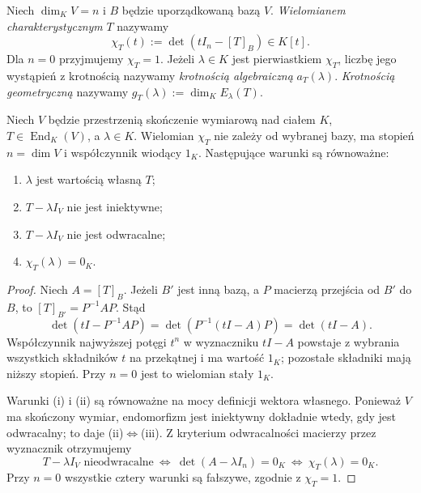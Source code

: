 \begin{definicja}
\label{def:lin14-charpoly}
Niech \(\dim_K V=n\) i \(B\) będzie
uporządkowaną bazą \(V\).
\emph{Wielomianem charakterystycznym}
\(T\) nazywamy
\[
 \chi_T(t):=\det(tI_n-[T]_B)\in K[t].
\]
Dla \(n=0\) przyjmujemy \(\chi_T=1\).
Jeżeli \(\lambda\in K\) jest pierwiastkiem
\(\chi_T\), liczbę jego wystąpień
z krotnością nazywamy
\emph{krotnością algebraiczną}
\(a_T(\lambda)\).
\emph{Krotnością geometryczną}
nazywamy
\(g_T(\lambda):=\dim_K E_\lambda(T)\).
\end{definicja}

\begin{stwierdzenie}
\label{prop:lin14-charpoly}
Niech \(V\) będzie przestrzenią skończenie
wymiarową nad ciałem \(K\),
\(T\in\operatorname{End}_K(V)\),
a \(\lambda\in K\).
Wielomian \(\chi_T\) nie zależy
od wybranej bazy, ma stopień
\(n=\dim V\) i współczynnik wiodący \(1_K\).
Następujące warunki są równoważne:
\begin{enumerate}[label=(\roman*)]
\item \(\lambda\) jest wartością własną \(T\);
\item \(T-\lambda I_V\) nie jest iniektywne;
\item \(T-\lambda I_V\) nie jest odwracalne;
\item \(\chi_T(\lambda)=0_K\).
\end{enumerate}
\end{stwierdzenie}
\begin{proof}
Niech \(A=[T]_B\).
Jeżeli \(B'\) jest inną bazą, a
\(P\) macierzą przejścia od \(B'\) do \(B\),
to
\([T]_{B'}=P^{-1}AP\).
Stąd
\[
 \det(tI-P^{-1}AP)
 =\det(P^{-1}(tI-A)P)=\det(tI-A).
\]
Współczynnik najwyższej potęgi \(t^n\)
w wyznaczniku \(tI-A\) powstaje
z wybrania wszystkich składników \(t\)
na przekątnej i ma wartość \(1_K\);
pozostałe składniki mają niższy stopień.
Przy \(n=0\) jest to wielomian stały \(1_K\).

Warunki (i) i (ii) są równoważne
na mocy definicji wektora własnego.
Ponieważ \(V\) ma skończony wymiar,
endomorfizm jest iniektywny dokładnie
wtedy, gdy jest odwracalny;
to daje (ii)\(\Leftrightarrow\)(iii).
Z kryterium odwracalności macierzy
przez wyznacznik otrzymujemy
\[
 T-\lambda I_V\text{ nieodwracalne}
 \ \Longleftrightarrow\
 \det(A-\lambda I_n)=0_K
 \ \Longleftrightarrow\
 \chi_T(\lambda)=0_K.
\]
Przy \(n=0\) wszystkie cztery warunki
są fałszywe, zgodnie z \(\chi_T=1\).
\end{proof}

